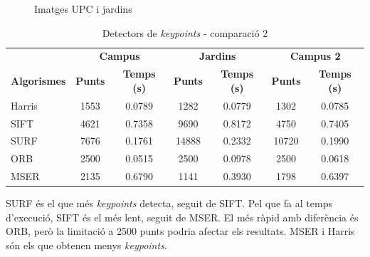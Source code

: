 \begin{figure}[!htb]
				\label{fig:awesome_image3}
			\endminipage
			\caption{Imatges UPC i jardins}
		\end{figure}

		\begin{table}[H]
			\begin{center}
				\begin{tabular}{l | c c | c c | c c}
					& \multicolumn{2}{c|}{\textbf{Campus}} & \multicolumn{2}{c|}{\textbf{Jardins}} & \multicolumn{2}{c}{\textbf{Campus 2}} \\
					\textbf{Algorismes} & \textbf{Punts} & \textbf{Temps (s)} & \textbf{Punts} & \textbf{Temps (s)} & \textbf{Punts} & \textbf{Temps (s)} \\ \hline
					Harris & 1553 & 0.0789 & 1282 & 0.0779 & 1302 & 0.0785 \\
					SIFT & 4621 & 0.7358 & 9690 & 0.8172 & 4750 & 0.7405 \\
					SURF & 7676 & 0.1761 & 14888 & 0.2332 & 10720 & 0.1990 \\
					ORB & 2500 & 0.0515 & 2500 & 0.0978 & 2500 & 0.0618 \\
					MSER & 2135 & 0.6790 & 1141 & 0.3930 & 1798 & 0.6397 \\
				\end{tabular}
			\end{center}
			\caption{Detectors de \textit{keypoints} - comparació 2}
		\end{table}
		\noindent
		SURF és el que més \textit{keypoints} detecta, seguit de SIFT. Pel que fa al temps d'execució, SIFT és el més lent, seguit de MSER. El més ràpid amb diferència és ORB, però la
		limitació a 2500 punts podria afectar els resultats. MSER i Harris són els que obtenen menys \textit{keypoints}.

